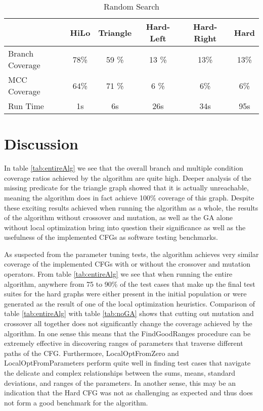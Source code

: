 \documentclass[runningheads]{llncs}
\begin{document}
\begin{table}[h!]
	\begin{center}
		
		\def\arraystretch{1.3}%
		\setlength\tabcolsep{1em}
		\begin{tabular}{| l | c  c  c  c c |}
			\hline
			& HiLo  		 & Triangle		& Hard-Left	& 	Hard-Right 		& Hard		\\ \hline
			Branch Coverage	 & 78\%         & 59	\%      & 13 \%      	& 13\%          & 13\%      \\ \hline
			MCC Coverage	 & 64\%         & 71 \%        & 6 \%      	& 6\%          & 6\%      \\ \hline
			Run Time		 & 1s          	 & 6s           & 26s       	& 34s          	& 95s       \\ \hline
		\end{tabular}
	\end{center}
	\caption{Random Search \label{tab:randSrch}}
\end{table}

\FloatBarrier

\section{Discussion}	\label{discussion}
In table \ref{tab:entireAlg} we see that the overall branch and multiple condition coverage ratios achieved by the algorithm are quite high. Deeper analysis of the missing predicate for the triangle graph showed that it is actually unreachable, meaning the algorithm does in fact achieve 100\% coverage of this graph. Despite these exciting results achieved when running the algorithm as a whole, the results of the algorithm without crossover and mutation, as well as the GA alone without local optimization bring into question their significance as well as the usefulness of the implemented CFGs as software testing benchmarks.

As suspected from the parameter tuning tests, the algorithm achieves very similar coverage of the implemented CFGs with or without the crossover and mutation operators. From table \ref{tab:entireAlg} we see that when running the entire algorithm, anywhere from 75 to 90\% of the test cases that make up the final test suites for the hard graphs were either present in the initial population or were generated as the result of one of the local optimization heuristics. Comparison of table \ref{tab:entireAlg} with table \ref{tab:noGA} shows that cutting out mutation and crossover all together does not significantly change the coverage achieved by the algorithm. In one sense this means that the FindGoodRanges procedure can be extremely effective in discovering ranges of parameters that traverse different paths of the CFG. Furthermore, LocalOptFromZero and LocalOptFromParameters perform quite well in finding test cases that navigate the delicate and complex relationships between the sums, means, standard deviations, and ranges of the parameters. In another sense, this may be an indication that the Hard CFG was not as challenging as expected and thus does not form a good benchmark for the algorithm.
\end{document}
